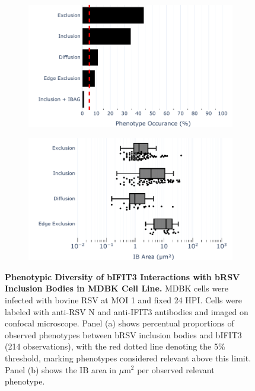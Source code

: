 \begin{figure}
    \begin{subfigure}{0.495\textwidth}
        \caption{}
        \includegraphics[width=1\linewidth]{08. Chapter 3/Figs/02. Infection/03. IFIT3/07. bar_i3_mdbk.pdf} 
    \end{subfigure}
    \begin{subfigure}{0.495\textwidth}
        \caption{}
        \includegraphics[width=1\linewidth]{08. Chapter 3/Figs/02. Infection/03. IFIT3/08. box_i3_mdbk.pdf}
    \end{subfigure}
    \caption[Phenotypic Diversity of bIFIT3 Interactions with bRSV Inclusion Bodies in MDBK Cell Line.]{\textbf{Phenotypic Diversity of bIFIT3 Interactions with bRSV Inclusion Bodies in MDBK Cell Line.} MDBK cells were infected with bovine RSV at MOI 1 and fixed 24 HPI. Cells were labeled with anti-RSV N and anti-IFIT3 antibodies and imaged on confocal microscope. Panel (a) shows percentual proportions of observed phenotypes between bRSV inclusion bodies and bIFIT3 (214 observations), with the red dotted line denoting the 5\% threshold, marking phenotypes considered relevant above this limit. Panel (b) shows the IB area in \(\mu \mbox{m}^2\) per observed relevant phenotype.}
    \label{fig:Phenotypic Diversity of bIFIT3 Interactions with bRSV Inclusion Bodies in MDBK Cell Line}
\end{figure}

